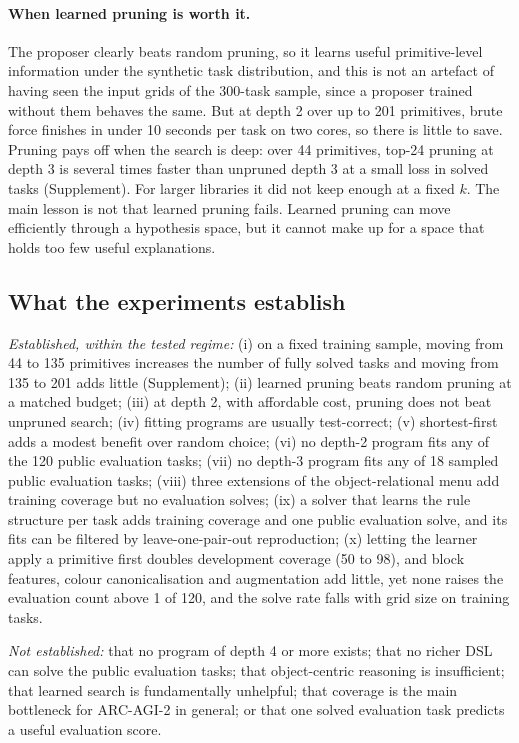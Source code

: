 \documentclass[sigconf,nonacm]{acmart}
\begin{document}
\paragraph{When learned pruning is worth it.} The proposer clearly beats random pruning, so it learns useful primitive-level information under the synthetic task distribution, and this is not an artefact of having seen the input grids of the 300-task sample, since a proposer trained without them behaves the same. But at depth 2 over up to 201 primitives, brute force finishes in under 10 seconds per task on two cores, so there is little to save. Pruning pays off when the search is deep: over 44 primitives, top-24 pruning at depth 3 is several times faster than unpruned depth 3 at a small loss in solved tasks (Supplement). For larger libraries it did not keep enough at a fixed $k$. The main lesson is not that learned pruning fails. Learned pruning can move efficiently through a hypothesis space, but it cannot make up for a space that holds too few useful explanations.

\subsection{What the experiments establish}\label{sec:established}

\emph{Established, within the tested regime:} (i) on a fixed training sample, moving from 44 to 135 primitives increases the number of fully solved tasks and moving from 135 to 201 adds little (Supplement); (ii) learned pruning beats random pruning at a matched budget; (iii) at depth 2, with affordable cost, pruning does not beat unpruned search; (iv) fitting programs are usually test-correct; (v) shortest-first adds a modest benefit over random choice; (vi) no depth-2 program fits any of the 120 public evaluation tasks; (vii) no depth-3 program fits any of 18 sampled public evaluation tasks; (viii) three extensions of the object-relational menu add training coverage but no evaluation solves; (ix) a solver that learns the rule structure per task adds training coverage and one public evaluation solve, and its fits can be filtered by leave-one-pair-out reproduction; (x) letting the learner apply a primitive first doubles development coverage (50 to 98), and block features, colour canonicalisation and augmentation add little, yet none raises the evaluation count above 1 of 120, and the solve rate falls with grid size on training tasks.

\emph{Not established:} that no program of depth 4 or more exists; that no richer DSL can solve the public evaluation tasks; that object-centric reasoning is insufficient; that learned search is fundamentally unhelpful; that coverage is the main bottleneck for ARC-AGI-2 in general; or that one solved evaluation task predicts a useful evaluation score.
\end{document}
